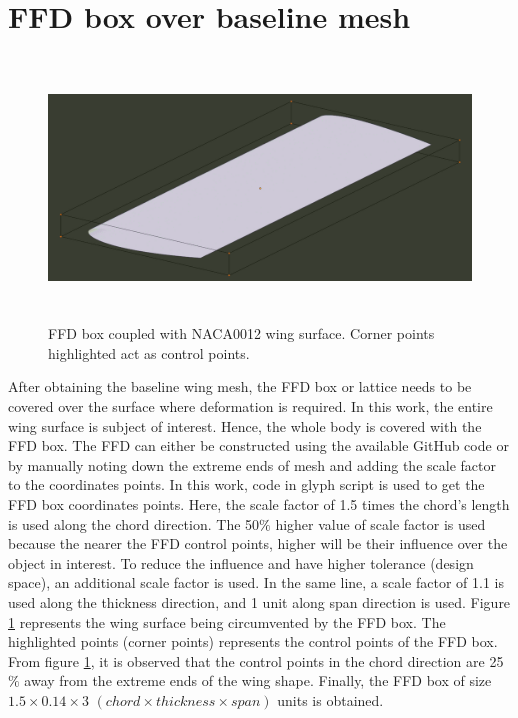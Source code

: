 \section{FFD box over baseline mesh}
\begin{figure}
    \centering
    \includegraphics[height = 70mm, width=\textwidth]{figures/wing_FFD_corner_pt.png}
    \caption{FFD box coupled with NACA0012 wing surface. Corner points highlighted act as control points.}
    \label{ffd_wing_corner}
\end{figure}
After obtaining the baseline wing mesh, the FFD box or lattice needs to be covered over the surface where deformation is required. In this work, the entire wing surface is subject of interest. Hence, the whole body is covered with the FFD box. The FFD can either be constructed using the available GitHub code or by manually noting down the extreme ends of mesh and adding the scale factor to the coordinates points. In this work, code in glyph script is used to get the FFD box coordinates points. Here, the scale factor of 1.5 times the chord's length is used along the chord direction. The 50$\%$ higher value of scale factor is used because the nearer the FFD control points, higher will be their influence over the object in interest. To reduce the influence and have higher tolerance (design space), an additional scale factor is used. In the same line, a scale factor of 1.1 is used along the thickness direction, and 1 unit along span direction is used. Figure \ref{ffd_wing_corner} represents the wing surface being circumvented by the FFD box. The highlighted points (corner points) represents the control points of the FFD box. From figure \ref{ffd_wing_corner}, it is observed that the control points in the chord direction are 25$\%$ away from the extreme ends of the wing shape. Finally, the FFD box of size $1.5 \times 0.14 \times 3$ $(chord \times thickness \times span)$ units is obtained. 

